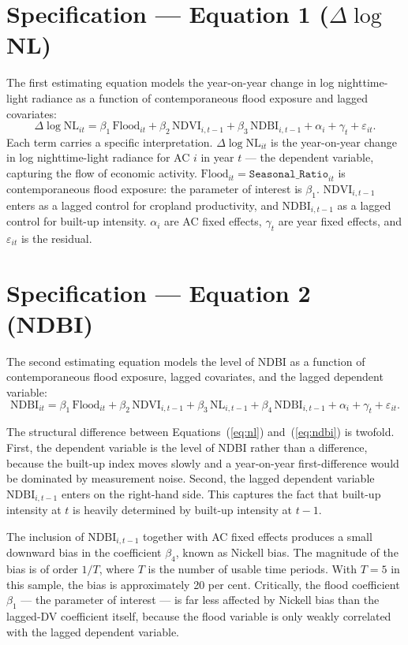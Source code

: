 \documentclass[12pt,a4paper,oneside]{report}
\begin{document}
\section{Specification --- Equation 1 ($\Delta \log$ NL)}
The first estimating equation models the year-on-year change in log nighttime-light radiance as a function of contemporaneous flood exposure and lagged covariates:
\begin{equation}
\Delta \log \mathrm{NL}_{it} = \beta_1 \, \mathrm{Flood}_{it} + \beta_2 \, \mathrm{NDVI}_{i,t-1} + \beta_3 \, \mathrm{NDBI}_{i,t-1} + \alpha_i + \gamma_t + \varepsilon_{it}.
\label{eq:nl}
\end{equation}
Each term carries a specific interpretation. $\Delta \log \mathrm{NL}_{it}$ is the year-on-year change in log nighttime-light radiance for AC $i$ in year $t$ --- the dependent variable, capturing the flow of economic activity. $\mathrm{Flood}_{it} = \texttt{Seasonal\_Ratio}_{it}$ is contemporaneous flood exposure: the parameter of interest is $\beta_1$. $\mathrm{NDVI}_{i,t-1}$ enters as a lagged control for cropland productivity, and $\mathrm{NDBI}_{i,t-1}$ as a lagged control for built-up intensity. $\alpha_i$ are AC fixed effects, $\gamma_t$ are year fixed effects, and $\varepsilon_{it}$ is the residual.

\section{Specification --- Equation 2 (NDBI)}
The second estimating equation models the level of NDBI as a function of contemporaneous flood exposure, lagged covariates, and the lagged dependent variable:
\begin{equation}
\mathrm{NDBI}_{it} = \beta_1 \, \mathrm{Flood}_{it} + \beta_2 \, \mathrm{NDVI}_{i,t-1} + \beta_3 \, \mathrm{NL}_{i,t-1} + \beta_4 \, \mathrm{NDBI}_{i,t-1} + \alpha_i + \gamma_t + \varepsilon_{it}.
\label{eq:ndbi}
\end{equation}

The structural difference between Equations~(\ref{eq:nl}) and~(\ref{eq:ndbi}) is twofold. First, the dependent variable is the level of NDBI rather than a difference, because the built-up index moves slowly and a year-on-year first-difference would be dominated by measurement noise. Second, the lagged dependent variable $\mathrm{NDBI}_{i,t-1}$ enters on the right-hand side. This captures the fact that built-up intensity at $t$ is heavily determined by built-up intensity at $t-1$.

The inclusion of $\mathrm{NDBI}_{i,t-1}$ together with AC fixed effects produces a small downward bias in the coefficient $\beta_4$, known as Nickell bias. The magnitude of the bias is of order $1/T$, where $T$ is the number of usable time periods. With $T = 5$ in this sample, the bias is approximately 20 per cent. Critically, the flood coefficient $\beta_1$ --- the parameter of interest --- is far less affected by Nickell bias than the lagged-DV coefficient itself, because the flood variable is only weakly correlated with the lagged dependent variable.
\end{document}
